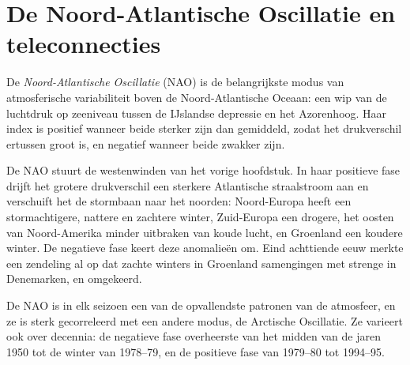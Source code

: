 \section{De Noord-Atlantische Oscillatie en teleconnecties}\label{sec:b2:climate-variability:nao}

\begin{definition}\label{def:b2:climate-variability:nao}
De \emph{Noord-Atlantische Oscillatie} (NAO) is de belangrijkste modus
van atmosferische variabiliteit boven de Noord-Atlantische Oceaan: een wip van de luchtdruk op zeeniveau tussen de
IJslandse depressie en het Azorenhoog. Haar index is positief wanneer beide sterker zijn dan gemiddeld, zodat
het drukverschil ertussen groot is, en negatief wanneer beide zwakker zijn.
\end{definition}

De NAO stuurt de westenwinden van het vorige hoofdstuk. In haar positieve fase drijft het grotere
drukverschil een sterkere Atlantische straalstroom aan en verschuift het de stormbaan naar het noorden: Noord-Europa
heeft een stormachtigere, nattere en zachtere winter, Zuid-Europa een drogere, het oosten van Noord-Amerika
minder uitbraken van koude lucht, en Groenland een koudere winter. De negatieve fase keert deze
anomalieën om. Eind achttiende eeuw merkte een zendeling al op dat zachte winters in
Groenland samengingen met strenge in Denemarken, en omgekeerd.

De NAO is in elk seizoen een van de opvallendste patronen van de atmosfeer, en ze is
sterk gecorreleerd met een andere modus, de Arctische Oscillatie. Ze varieert ook over decennia: de negatieve fase overheerste
van het midden van de jaren 1950 tot de winter van 1978--79, en de positieve fase van 1979--80 tot 1994--95.

